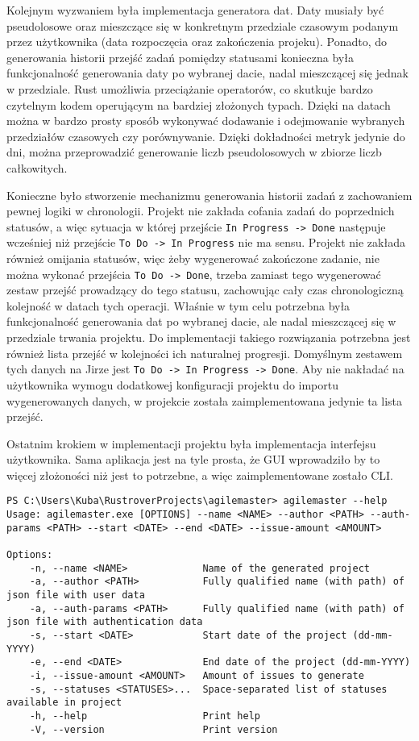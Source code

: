 Kolejnym wyzwaniem była implementacja generatora dat. Daty musiały być pseudolosowe oraz mieszczące się w konkretnym przedziale czasowym
podanym przez użytkownika (data rozpoczęcia oraz zakończenia projeku). Ponadto, do generowania historii przejść zadań pomiędzy statusami
konieczna była funkcjonalność generowania daty po wybranej dacie, nadal mieszczącej się jednak w przedziale.
Rust umożliwia przeciążanie operatorów, co skutkuje bardzo czytelnym kodem operującym na bardziej złożonych typach.
Dzięki na datach można w bardzo prosty sposób wykonywać dodawanie i odejmowanie wybranych przedziałów czasowych czy porównywanie.
Dzięki dokładności metryk jedynie do dni, można przeprowadzić generowanie liczb pseudolosowych w zbiorze liczb całkowitych.

Konieczne było stworzenie mechanizmu generowania historii zadań z zachowaniem pewnej logiki w chronologii.
Projekt nie zakłada cofania zadań do poprzednich statusów, a więc sytuacja w której przejście \texttt{In Progress -> Done} następuje
wcześniej niż przejście \texttt{To Do -> In Progress} nie ma sensu.
Projekt nie zakłada również omijania statusów, więc żeby wygenerować zakończone zadanie, nie można wykonać przejścia \texttt{To Do -> Done},
trzeba zamiast tego wygenerować zestaw przejść prowadzący do tego statusu, zachowując cały czas chronologiczną kolejność w datach
tych operacji. Właśnie w tym celu potrzebna była funkcjonalność generowania dat po wybranej dacie, ale nadal mieszczącej się w przedziale trwania projektu.
Do implementacji takiego rozwiązania potrzebna jest również lista przejść w kolejności ich naturalnej progresji.
Domyślnym zestawem tych danych na Jirze jest \texttt{To Do -> In Progress -> Done}.
Aby nie nakładać na użytkownika wymogu dodatkowej konfiguracji projektu do importu wygenerowanych danych, w projekcie została zaimplementowana
jedynie ta lista przejść.

Ostatnim krokiem w implementacji projektu była implementacja interfejsu użytkownika. Sama aplikacja jest na tyle prosta, że GUI wprowadziło by to więcej
złożoności niż jest to potrzebne, a więc zaimplementowane zostało CLI.

\begin{lstlisting}[caption=CLI programu agilemaster]
PS C:\Users\Kuba\RustroverProjects\agilemaster> agilemaster --help
Usage: agilemaster.exe [OPTIONS] --name <NAME> --author <PATH> --auth-params <PATH> --start <DATE> --end <DATE> --issue-amount <AMOUNT>

Options:
    -n, --name <NAME>             Name of the generated project
    -a, --author <PATH>           Fully qualified name (with path) of json file with user data
    -a, --auth-params <PATH>      Fully qualified name (with path) of json file with authentication data
    -s, --start <DATE>            Start date of the project (dd-mm-YYYY)
    -e, --end <DATE>              End date of the project (dd-mm-YYYY)
    -i, --issue-amount <AMOUNT>   Amount of issues to generate
    -s, --statuses <STATUSES>...  Space-separated list of statuses available in project
    -h, --help                    Print help
    -V, --version                 Print version
\end{lstlisting}

